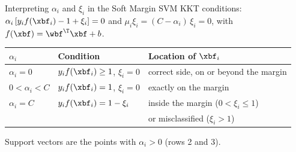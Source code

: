 \documentclass[aspectratio=169,xcolor=dvipsnames,svgnames,x11names,fleqn]{beamer}
\begin{document}
\begin{frame}{Interpreting $\alpha_i$ and $\xi_i$ in the Soft Margin SVM}
    KKT conditions: $\alpha_i\left[y_i f(\xbf_i) - 1 + \xi_i\right] = 0$ and $\mu_i \xi_i = (C - \alpha_i)\,\xi_i = 0$, with $f(\xbf) = \wbf^\T\xbf + b$.

    \vspace{10pt}

    \begin{center}
    \begin{tabular}{lll}
        \toprule
        $\alpha_i$ & Condition & Location of $\xbf_i$ \\
        \midrule
        $\alpha_i = 0$ & $y_i f(\xbf_i) \geq 1$, \; $\xi_i = 0$ & correct side, on or beyond the margin \\
        $0 < \alpha_i < C$ & $y_i f(\xbf_i) = 1$, \; $\xi_i = 0$ & exactly on the margin \\
        $\alpha_i = C$ & $y_i f(\xbf_i) = 1 - \xi_i$ & inside the margin ($0 < \xi_i \leq 1$) \\
         & & or misclassified ($\xi_i > 1$) \\
        \bottomrule
    \end{tabular}
    \end{center}

    \vspace{6pt}

    Support vectors are the points with $\alpha_i > 0$ (rows 2 and 3).
\end{frame}
\end{document}
